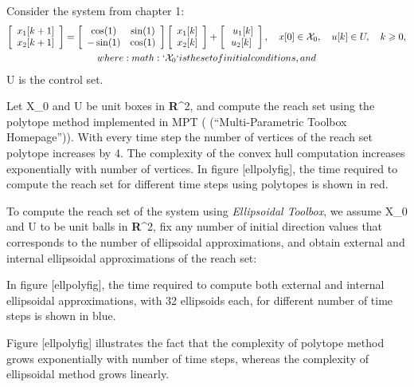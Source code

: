 \documentclass[letterpaper,10pt,english]{sphinxmanual}
\begin{document}
Consider the system from chapter 1:
\begin{gather}
\begin{split}  \left[\begin{array}{c}
  x_1[k+1]\\
  x_2[k+1]\end{array}\right] = \left[\begin{array}{cc}
  \cos(1) & \sin(1)\\
  -\sin(1) & \cos(1)\end{array}\right]\left[\begin{array}{c}
  x_1[k]\\
  x_2[k]\end{array}\right] + \left[\begin{array}{c}\
  u_1[k]\\
  u_2[k]\end{array}\right], ~~~ x[0]\in{\mathcal X}_0, ~~~ u[k]\in U, ~~~ k\geqslant0,\end{split}\notag\\\begin{split}where :math:`{\mathcal X}_0` is the set of initial conditions, and\end{split}\notag
\end{gather}
U is the control set.

Let {\mathcal X}_0 and U be unit boxes in
{\bf R}^2, and compute the reach set using the polytope method
implemented in MPT ( (“Multi-Parametric Toolbox Homepage”)). With every
time step the number of vertices of the reach set polytope increases by
4. The complexity of the convex hull computation increases
exponentially with number of vertices. In figure {[}ellpolyfig{]}, the time
required to compute the reach set for different time steps using
polytopes is shown in red.

To compute the reach set of the system using \emph{Ellipsoidal Toolbox}, we
assume {\mathcal X}_0 and U to be unit balls in
{\bf R}^2, fix any number of initial direction values that
corresponds to the number of ellipsoidal approximations, and obtain
external and internal ellipsoidal approximations of the reach set:

In figure {[}ellpolyfig{]}, the time required to compute both external and
internal ellipsoidal approximations, with 32 ellipsoids each,
for different number of time steps is shown in blue.

Figure {[}ellpolyfig{]} illustrates the fact that the complexity of polytope
method grows exponentially with number of time steps, whereas the
complexity of ellipsoidal method grows linearly.
\end{document}
